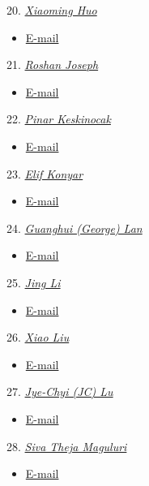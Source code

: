 20. \href{https://sites.gatech.edu/xiaoming-huo/}{\emph{Xiaoming Huo}}
\begin{itemize}
    \item \href{mailto:huo@isye.gatech.edu}{E-mail}
\end{itemize}

21. \href{https://sites.gatech.edu/roshan-joseph/}{\emph{Roshan Joseph}}
\begin{itemize}
    \item \href{roshan@gatech.edu}{E-mail}
\end{itemize}

22. \href{https://sites.gatech.edu/pinar-keskinocak/}{\emph{Pinar Keskinocak}}
\begin{itemize}
    \item \href{mailto:pinar@isye.gatech.edu}{E-mail}
\end{itemize}

23. \href{https://elifkonyar.github.io/}{\emph{Elif Konyar}}
\begin{itemize}
    \item \href{mailto:ekonyar3@gatech.edu}{E-mail}
\end{itemize}

24. \href{https://sites.gatech.edu/guanghui-lan/}{\emph{Guanghui (George) Lan}}
\begin{itemize}
    \item \href{mailto:george.lan@isye.gatech.edu}{E-mail}
\end{itemize}

25. \href{https://sites.gatech.edu/jing-li/}{\emph{Jing Li}}
\begin{itemize}
    \item \href{mailto:jing.li@isye.gatech.edu}{E-mail}
\end{itemize}

26. \href{https://sites.google.com/site/liuxiaosite1/}{\emph{Xiao Liu}}
\begin{itemize}
    \item \href{mailto:xiao.liu@isye.gatech.edu}{E-mail}
\end{itemize}

27. \href{https://www2.isye.gatech.edu/people/faculty/JC_Lu/}{\emph{Jye-Chyi (JC) Lu}}
\begin{itemize}
    \item \href{mailto:jclu@isye.gatech.edu}{E-mail}
\end{itemize}

28. \href{https://sites.google.com/site/sivatheja/}{\emph{Siva Theja Maguluri}}
\begin{itemize}
    \item \href{mailto:siva.theja@gatech.edu}{E-mail}
\end{itemize}

